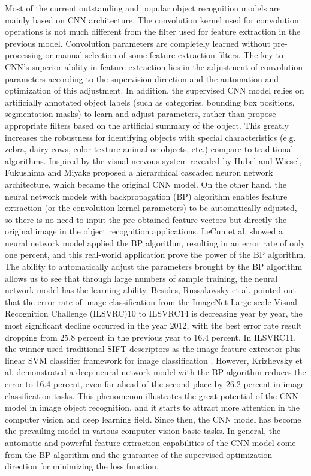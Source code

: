 \documentclass[10pt, a4paper]{article}
\begin{document}
\begin{multicols}{2}
	Most of the current outstanding and popular object recognition models are mainly based on CNN architecture. The convolution kernel used for convolution operations is not much different from the filter used for feature extraction in the previous model. Convolution parameters are completely learned without pre-processing or manual selection of some feature extraction filters. The key to CNN's superior ability in feature extraction lies in the adjustment of convolution parameters according to the supervision direction and the automation and optimization of this adjustment. In addition, the supervised CNN model relies on artificially annotated object labels (such as categories, bounding box positions, segmentation masks) to learn and adjust parameters, rather than propose appropriate filters based on the artificial summary of the object. This greatly increases the robustness for identifying objects with special characteristics (e.g. zebra, dairy cows, color texture animal or objects, etc.) compare to traditional algorithms. Inspired by the visual nervous system revealed by Hubel and Wiesel, Fukushima and Miyake \cite{fukushima1982neocognitron} proposed a hierarchical cascaded neuron network architecture, which became the original CNN model. On the other hand, the neural network models with backpropagation (BP) algorithm enables feature extraction (or the convolution kernel parameters) to be automatically adjusted, so there is no need to input the pre-obtained feature vectors but directly the original image in the object recognition applications. LeCun et al. \cite{lecun1989handwritten} showed a neural network model applied the BP algorithm, resulting in an error rate of only one percent, and this real-world application prove the power of the BP algorithm. The ability to automatically adjust the parameters brought by the BP algorithm allows us to see that through large numbers of sample training, the neural network model has the learning ability. Besides, Russakovsky et al. \cite{russakovskyimagenet} pointed out that the error rate of image classification from the ImageNet Large-scale Visual Recognition Challenge (ILSVRC)10 to ILSVRC14 is decreasing year by year, the most significant decline occurred in the year 2012, with the best error rate result dropping from 25.8 percent in the previous year to 16.4 percent. In ILSVRC11, the winner used traditional SIFT descriptors as the image feature extractor plus linear SVM classifier framework for image classification \cite{sanchez2011high}. However, Krizhevsky et al. \cite{krizhevsky2017imagenet} demonstrated a deep neural network model with the BP algorithm reduces the error to 16.4 percent, even far ahead of the second place by 26.2 percent in image classification tasks. This phenomenon illustrates the great potential of the CNN model in image object recognition, and it starts to attract more attention in the computer vision and deep learning field. Since then, the CNN model has become the prevailing model in various computer vision basic tasks. In general, the automatic and powerful feature extraction capabilities of the CNN model come from the BP algorithm and the guarantee of the supervised optimization direction for minimizing the loss function.


\end{multicols}
\end{document}
